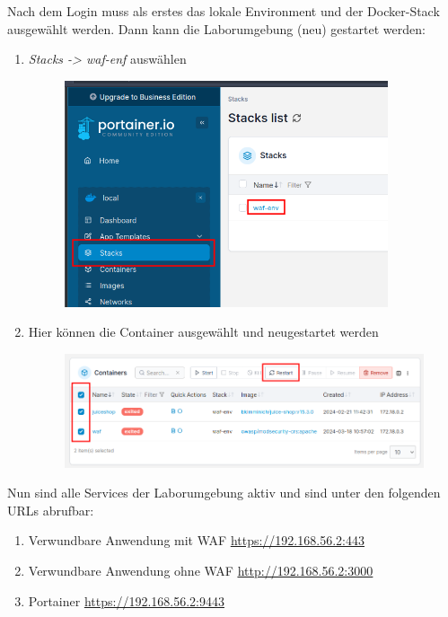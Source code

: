 Nach dem Login muss als erstes das lokale Environment und der Docker-Stack ausgewählt werden.
Dann kann die Laborumgebung (neu) gestartet werden:
\pagebreak

\begin{enumerate}
    \item \textit{Stacks -> waf-enf} auswählen
    \begin{figure}[!hbt]
        \centering
        \includegraphics[width=0.9\textwidth]{./images/waf-env-porteiner.png}
    \end{figure}
    \item Hier können die Container ausgewählt und neugestartet werden
    \begin{figure}[!hbt]
        \centering
        \includegraphics[width=\textwidth]{./images/restart-all.png}
    \end{figure}
\end{enumerate}

Nun sind alle Services der Laborumgebung aktiv und sind unter den folgenden URLs abrufbar:
\begin{enumerate}
    \item Verwundbare Anwendung mit WAF \href{https://192.168.56.2:443}{\underline{https://192.168.56.2:443}}
    \item Verwundbare Anwendung ohne WAF \href{http://192.168.56.2:3000}{\underline{http://192.168.56.2:3000}}
    \item Portainer \href{https://192.168.56.2:9443}{\underline{https://192.168.56.2:9443}}
\end{enumerate}

